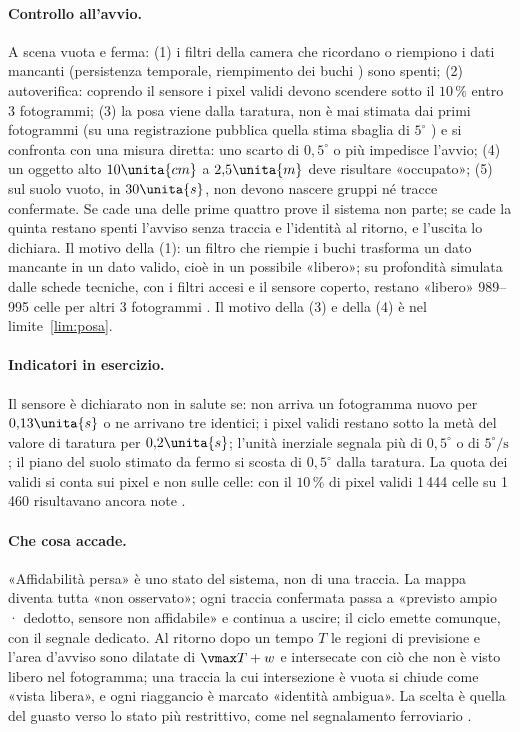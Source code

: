 \paragraph{Controllo all'avvio.} A scena vuota e ferma: (1) i filtri della camera che ricordano o riempiono i dati mancanti (persistenza temporale, riempimento dei buchi \cite{realsense-filtri-post}) sono spenti; (2) autoverifica: coprendo il sensore i pixel validi devono scendere sotto il $10\,\%$ entro 3 fotogrammi; (3) la posa viene dalla taratura, non è mai stimata dai primi fotogrammi (su una registrazione pubblica \cite{tum-rgbd} quella stima sbaglia di $5^\circ$ ) e si confronta con una misura diretta: uno scarto di $0{,}5^\circ$ o più impedisce l'avvio; (4) un oggetto alto $10\unita{cm}$ a $2{,}5\unita{m}$ deve risultare «occupato»; (5) sul suolo vuoto, in $30\unita{s}$, non devono nascere gruppi né tracce confermate. Se cade una delle prime quattro prove il sistema non parte; se cade la quinta restano spenti l'avviso senza traccia e l'identità al ritorno, e l'uscita lo dichiara. Il motivo della (1): un filtro che riempie i buchi trasforma un dato mancante in un dato valido, cioè in un possibile «libero»; su profondità simulata dalle schede tecniche, con i filtri accesi e il sensore coperto, restano «libero» 989--995 celle per altri 3 fotogrammi . Il motivo della (3) e della (4) è nel limite~\ref{lim:posa}.

\paragraph{Indicatori in esercizio.} Il sensore è dichiarato non in salute se: non arriva un fotogramma nuovo per $0{,}13\unita{s}$ o ne arrivano tre identici; i pixel validi restano sotto la metà del valore di taratura per $0{,}2\unita{s}$; l'unità inerziale segnala più di $0{,}5^\circ$ o di $5^\circ/\mathrm{s}$; il piano del suolo stimato da fermo si scosta di $0{,}5^\circ$ dalla taratura. La quota dei validi si conta sui pixel e non sulle celle: con il $10\,\%$ di pixel validi 1\,444 celle su 1\,460 risultavano ancora note .

\paragraph{Che cosa accade.} «Affidabilità persa» è uno stato del sistema, non di una traccia. La mappa diventa tutta «non osservato»; ogni traccia confermata passa a «previsto ampio · dedotto, sensore non affidabile» e continua a uscire; il ciclo emette comunque, con il segnale dedicato. Al ritorno dopo un tempo $T$ le regioni di previsione e l'area d'avviso sono dilatate di $\vmax T+w$ e intersecate con ciò che non è visto libero nel fotogramma; una traccia la cui intersezione è vuota si chiude come «vista libera», e ogni riaggancio è marcato «identità ambigua». La scelta è quella del guasto verso lo stato più restrittivo, come nel segnalamento ferroviario \cite{us-49cfr-236-205}.

